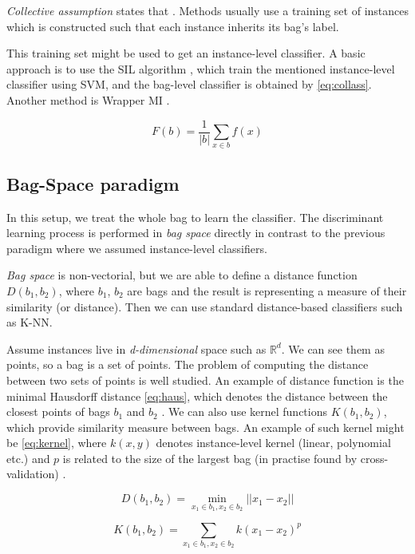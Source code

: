 \emph{Collective assumption} states that  \cite{Xu2003}. Methods usually use a training set of instances which is constructed such that each instance inherits its bag's label.

This training set might be used to get an instance-level classifier. A basic approach is to use the SIL algorithm \cite{Bunescu2007}, which train the mentioned instance-level classifier using SVM, and the bag-level classifier is obtained by \eqref{eq:collass}. Another method is Wrapper MI \cite{Frank2003}.

\begin{equation} \label{eq:collass}
    F(b)=\frac{1}{|b|}\sum_{x\in b}f(x)
\end{equation}

\subsection{Bag-Space paradigm}
In this setup, we treat the whole bag to learn the classifier. The discriminant learning process is performed in \emph{bag space} directly in contrast to the previous paradigm where we assumed instance-level classifiers.

\emph{Bag space} is non-vectorial, but we are able to define a distance function $D(b_1,b_2)$, where $b_1$, $b_2$ are bags and the result is representing a measure of their similarity (or distance). Then we can use standard distance-based classifiers such as K-NN.

Assume instances live in \emph{d-dimensional} space such as $\mathbb{R}^{d}$. We can see them as points, so a bag is a set of points. The problem of computing the distance between two sets of points is well studied. An example of distance function is the minimal Hausdorff distance \eqref{eq:haus}, which denotes the distance between the closest points of bags $b_1$ and $b_2$ \cite{Wang2000}. We can also use kernel functions $K(b_1,b_2)$, which provide similarity measure between bags. An example of such kernel might be \eqref{eq:kernel}, where $k(x,y)$  denotes instance-level kernel (linear, polynomial etc.) and $p$ is related to the size of the largest bag (in practise found by cross-validation) \cite{Gartner2002}.

\begin{equation} \label{eq:haus}
    D(b_1,b_2)=\min_{x_1\in b_1, x_2\in b_2}||x_1-x_2||
\end{equation}

\begin{equation} \label{eq:kernel}
    K(b_1,b_2)=\sum_{x_1\in b_1, x_2\in b_2}k(x_1-x_2)^{p}
\end{equation}

